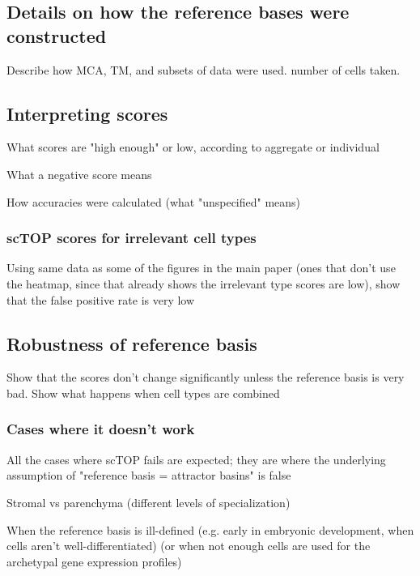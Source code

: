 \documentclass[aps,superscriptaddress, notitlepage,longbibliography]{revtex4-1}
\begin{document}
\subsection{Details on how the reference bases were constructed}
Describe how MCA, TM, and subsets of data were used. number of cells taken. 

\subsection{Interpreting scores}
What scores are "high enough" or low, according to aggregate or individual

What a negative score means

How accuracies were calculated (what "unspecified" means)

\subsubsection{scTOP scores for irrelevant cell types}
Using same data as some of the figures in the main paper (ones that don't use the heatmap, since that already shows the irrelevant type scores are low), show that the false positive rate is very low

\subsection{Robustness of reference basis}
Show that the scores don't change significantly unless the reference basis is very bad. Show what happens when cell types are combined

\subsubsection{Cases where it doesn't work}
All the cases where scTOP fails are expected; they are where the underlying assumption of "reference basis = attractor basins" is false

Stromal vs parenchyma (different levels of specialization)

When the reference basis is ill-defined (e.g. early in embryonic development, when cells aren't well-differentiated) (or when not enough cells are used for the archetypal gene expression profiles)


\end{document}
